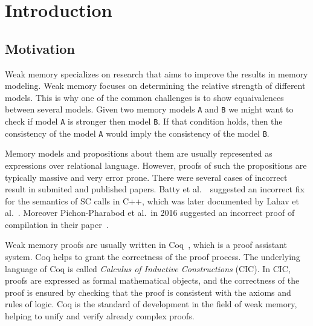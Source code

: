 \section{Introduction}

\subsection{Motivation}
Weak memory specializes on research that aims to improve the results in memory modeling. Weak memory focuses on determining the relative strength of different models. This is why one of the common challenges is to show equaivalences between several models. Given two memory models \texttt{A} and \texttt{B} we might want to check if model \texttt{A} is stronger then model \texttt{B}. If that condition holds, then the consistency of the model \texttt{A} would imply the consistency of the model \texttt{B}.

Memory models and propositions about them are usually represented as expressions over relational language. However, proofs of such the propositions are typically massive and very error prone. There were several cases of incorrect result in submited and published papers. Batty et al.~\cite{batty_2016}\ suggested an incorrect fix for the semantics of SC calls in C++, which was later documented by Lahav et al.~\cite{lahav2017repairing}. Moreover Pichon-Pharabod et al.\  in 2016 suggested an incorrect proof of compilation in their paper~\cite{PichonPharabod_Sewell16}. 

Weak memory proofs are usually written in Coq~\cite{bertot2013interactive}, which is a proof assistant system. Coq helps to grant the correctness of the proof process. The underlying language of Coq is called \textit{Calculus of Inductive Constructions} (CIC). In CIC, proofs are expressed as formal mathematical objects, and the correctness of the proof is ensured by checking that the proof is consistent with the axioms and rules of logic. Coq is the standard of development in the field of weak memory, helping to unify and verify already complex proofs. 

